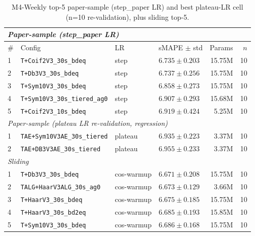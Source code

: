 \documentclass[11pt,a4paper]{article}
\begin{document}
\begin{table}[h]
\centering
\scriptsize
\setlength{\tabcolsep}{2.5pt}
\caption{M4-Weekly top-5 paper-sample (step\_paper LR) and best plateau-LR cell (n=10 re-validation), plus sliding top-5.}
\label{tab:m4_weekly_full}
\begin{tabular}{@{}llllrr@{}}
\toprule
\multicolumn{6}{l}{\textit{Paper-sample (step\_paper LR)}} \\
\midrule
\# & Config & LR & sMAPE $\pm$ std & Params & $n$ \\
\midrule
1 & \texttt{T+Coif2V3\_30s\_bdeq}           & step    & $\mathbf{6.735 \pm 0.203}$ & 15.75M & 10 \\
2 & \texttt{T+Db3V3\_30s\_bdeq}             & step    & $6.737 \pm 0.256$          & 15.75M & 10 \\
3 & \texttt{T+Sym10V3\_30s\_bdeq}           & step    & $6.858 \pm 0.273$          & 15.75M & 10 \\
4 & \texttt{T+Sym10V3\_30s\_tiered\_ag0}    & step    & $6.907 \pm 0.293$          & 15.68M & 10 \\
5 & \texttt{T+Coif2V3\_10s\_bdeq}           & step    & $6.919 \pm 0.424$          & 5.25M  & 10 \\
\midrule
\multicolumn{6}{l}{\textit{Paper-sample (plateau LR re-validation, regression)}} \\
\midrule
1 & \texttt{TAE+Sym10V3AE\_30s\_tiered}     & plateau & $6.935 \pm 0.223$          & 3.37M  & 10 \\
2 & \texttt{TAE+DB3V3AE\_30s\_tiered}       & plateau & $6.955 \pm 0.233$          & 3.37M  & 10 \\
\midrule
\multicolumn{6}{l}{\textit{Sliding}} \\
\midrule
1 & \texttt{T+Db3V3\_30s\_bdeq}             & cos-warmup & $\mathbf{6.671 \pm 0.208}$ & 15.75M & 10 \\
2 & \texttt{TALG+HaarV3ALG\_30s\_ag0}       & cos-warmup & $6.673 \pm 0.129$          & 3.66M  & 10 \\
3 & \texttt{T+HaarV3\_30s\_bdeq}            & cos-warmup & $6.675 \pm 0.185$          & 15.75M & 10 \\
4 & \texttt{T+HaarV3\_30s\_bd2eq}           & cos-warmup & $6.685 \pm 0.193$          & 15.85M & 10 \\
5 & \texttt{T+Sym10V3\_30s\_bdeq}           & cos-warmup & $6.686 \pm 0.168$          & 15.75M & 10 \\
\bottomrule
\end{tabular}
\end{table}
\end{document}
